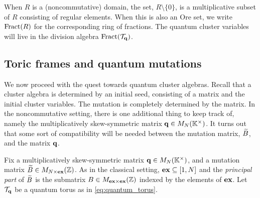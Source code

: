 When $R$ is a (noncommutative) domain, the set, $R \setminus \{0\}$, is a
multiplicative subset of $R$ consisting of regular elements. When this is also an Ore
set, we write $\operatorname{Fract}(R)$ for the corresponding ring of
fractions. The quantum cluster variables will live in the division algebra
$\operatorname{Fract}(\mathcal{T}_{\mathbf{q}})$.

\subsection{Toric frames and quantum mutations}

We now proceed with the quest towards quantum cluster algebras. Recall that a cluster
algebra is determined by an initial seed, consisting of a matrix and the initial
cluster variables. The mutation is completely determined by the matrix. In the
noncommutative setting, there is one additional thing to keep track of, namely the
multiplicatively skew-symmetric matrix $\mathbf{q} \in M_N(\mathbb{K}^\times)$. It turns out that
some sort of compatibility will be needed between the mutation matrix, $\widetilde{B}$, and the
matrix $\mathbf{q}$.

Fix a multiplicatively skew-symmetric matrix $\mathbf{q} \in M_N (\mathbb{K}^\times)$, and a
mutation matrix $\widetilde{B} \in M_{N \times \mathbf{ex}}(\mathbb{Z})$. As in the classical setting, $\mathbf{ex}
	\subseteq [1, N]$ and the \emph{principal part} of $\widetilde{B}$ is the
submatrix $B \in M_{\mathbf{ex} \times \mathbf{ex}}(\mathbb{Z})$ indexed by the elements of $\mathbf{ex}$. Let
$\mathcal{T}_{\mathbf{q}}$ be a quantum torus as in \cref{eq:quantum_torus}.

